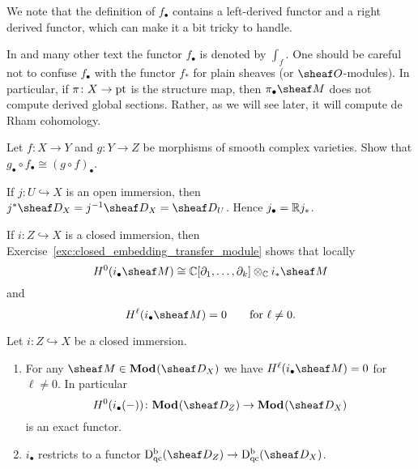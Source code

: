 \documentclass[number-in-sections,a4paper]{notes}
\begin{document}
We note that the definition of $f_\bullet$ contains a left-derived functor and a right derived functor, which can make it a bit tricky to handle.

\begin{Remark}
    In \cite{HottaTakeuchiTanisaki:2008:DModulesPerverseSheavesRepresentationTheory} and many other text the functor $f_\bullet$ is denoted by $\int_f$.
    One should be careful not to confuse $f_\bullet$ with the functor $f_*$ for plain sheaves (or $\sO$-modules).
    In particular, if $\pi\colon X \to \mathrm{pt}$ is the structure map, then $\pi_\bullet\sheaf M$ does not compute derived global sections.
    Rather, as we will see later, it will compute de Rham cohomology.
\end{Remark}

\begin{Exercise}
    Let $f\colon X \to Y$ and $g\colon Y \to Z$ be morphisms of smooth complex varieties.
    Show that $g_\bullet \circ f_\bullet \cong (g \circ f)_\bullet$.
\end{Exercise}


\begin{Example}
    If $j\colon U \hookrightarrow X$ is an open immersion, then $j^*\sD_X = j^{-1}\sD_X = \sD_U$.
    Hence $j_\bullet = {\mathbb{R}} j_*$.
\end{Example}

\begin{Example}
    If $i\colon Z \hookrightarrow X$ is a closed immersion, then Exercise~\ref{exc:closed_embedding_transfer_module} shows that locally
    \[
        H^0(i_\bullet \sheaf M) \cong \CC[\partial_1,\dotsc,\partial_k] \otimes_\CC i_*\sheaf M
    \]
    and
    \[
        H^\ell(i_\bullet \sheaf M) = 0 \qquad \text{for } \ell \ne 0.
    \]
\end{Example}

\begin{Corollary}
    Let $i\colon Z \hookrightarrow X$ be a closed immersion.
    \begin{enumerate}
        \item For any $\sheaf M \in \catDMod{X}$ we have $H^\ell(i_\bullet \sheaf M) = 0$ for $\ell \ne 0$.
            In particular 
            \[
                H^0(i_\bullet (-))\colon \catDMod{Z} \to \catDMod{X}
            \]
            is an exact functor.
        \item $i_\bullet$ restricts to a functor $\catDbDModqc{Z} \to \catDbDModqc{X}$.
    \end{enumerate}
\end{Corollary}
\end{document}
